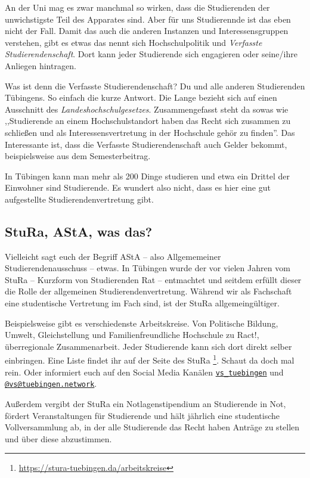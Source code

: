 An der Uni mag es zwar manchmal so wirken, dass die Studierenden der unwichstigste
Teil des Apparates sind.
Aber für uns Studierennde ist das eben nicht der Fall.
Damit das auch die anderen Instanzen und Interessensgruppen verstehen, gibt es
etwas das nennt sich Hochschulpolitik und \textit{Verfasste
Studierendenschaft}. Dort kann jeder Studierende sich engagieren oder seine/ihre
Anliegen hintragen.

Was ist denn die Verfasste Studierendenschaft? Du und alle anderen Studierenden
Tübingens. So einfach die kurze Antwort. Die Lange bezieht sich auf einen
Ausschnitt des \textit{Landeshochschulgesetzes}.  Zusammengefasst steht da
sowas wie ,,Studierende an einem Hochschulstandort haben das Recht sich zusammen
zu schließen und als Interessensvertretung in der Hochschule gehör zu finden''.
Das Interessante ist, dass die Verfasste Studierendenschaft auch Gelder bekommt,
beispielsweise aus dem Semesterbeitrag.

In Tübingen kann man mehr als 200 Dinge studieren und etwa ein Drittel der
Einwohner sind Studierende. Es wundert also nicht, dass es hier eine
gut aufgestellte Studierendenvertretung gibt.


\subsection{StuRa, AStA, was das?}

Vielleicht sagt euch der Begriff AStA -- also Allgememeiner
Studierendenausschuss -- etwas. In Tübingen wurde der vor vielen Jahren vom
StuRa -- Kurzform von Studierenden Rat -- entmachtet und seitdem erfüllt dieser
die Rolle der allgemeinen Studierendenvertretung. Während wir als Fachschaft
eine studentische Vertretung im Fach sind, ist der StuRa allgemeingültiger.

Beispielsweise gibt es verschiedenste Arbeitskreise. Von Politische Bildung,
Umwelt, Gleichstellung und Familienfreundliche Hochschule zu Ract!, überregionale
Zusammenarbeit. Jeder Studierende kann sich dort direkt selber einbringen.
Eine Liste findet ihr auf der Seite des StuRa
\footnote{\url{https://stura-tuebingen.da/arbeitskreise}}. Schaut da doch mal
rein. Oder informiert euch auf den Social Media Kanälen 
\href{https://www.instagram.com/vs\_tuebingen}{\texttt{vs\_tuebingen}}
und \href{https://toot.kif.rocks/@vs@tuebingen.network}{\texttt{@vs@tuebingen.network}}.


Außerdem vergibt der StuRa ein Notlagenstipendium an Studierende in Not, fördert
Veranstaltungen für Studierende und hält jährlich eine studentische Vollversammlung
ab, in der alle Studierende das Recht haben Anträge zu stellen und über diese abzustimmen.

